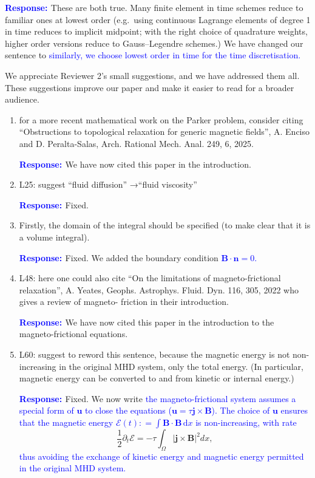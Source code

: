 \documentclass{article}
\theoremstyle{definition}
\newcommand{\dx}{\,\mathrm{d}x}
\newcommand{\rv}[1]{%
  \colorbox{gray!20}{%
    \parbox{0.96\linewidth}{%
      \small #1
    }%
  }%
}
\newcommand{\rp}{\textbf{\textcolor{blue}{Response: }}}
\newcommand{\blue}[1]{\textcolor{blue}{#1}}
\begin{document}
\begin{enumerate}
\rp These are both true. Many finite element in time schemes reduce to familiar ones at lowest order (e.g.~using continuous Lagrange elements of degree 1 in time reduces to implicit midpoint; with the right choice of quadrature weights, higher order versions reduce to Gauss--Legendre schemes.) We have changed our sentence to \blue{similarly, we choose lowest order in time for the time discretisation.}
\end{enumerate}

We appreciate Reviewer 2's small suggestions, and we have addressed them all. These suggestions improve our paper and make it easier to read for a broader audience.

\begin{enumerate}
    \item \rv{for a more recent mathematical work on the Parker problem, consider citing “Obstructions to topological relaxation for generic magnetic fields”, A. Enciso and D. Peralta-Salas,
Arch. Rational Mech. Anal. 249, 6, 2025.}

\rp We have now cited this paper in the introduction.

\item \rv{L25: suggest “fluid diﬀusion” →“fluid viscosity”}

\rp Fixed. 

\item \rv{Firstly, the domain of the integral should be specified (to make clear that it is a
volume integral).}

\rp Fixed. We added the boundary condition \blue{$\bm B\cdot \bm n=0$.} 

\item \rv{L48: here one could also cite “On the limitations of magneto-frictional relaxation”, A.
Yeates, Geophs. Astrophys. Fluid. Dyn. 116, 305, 2022 who gives a review of magneto-
friction in their introduction.}

\rp We have now cited this paper in the introduction to the magneto-frictional equations.

\item \rv{L60: suggest to reword this sentence, because the magnetic energy is not non-increasing
in the original MHD system, only the total energy. (In particular, magnetic energy can be
converted to and from kinetic or internal energy.)}

\rp Fixed. We now write \blue{the magneto-frictional system assumes a special form of $\bm{u}$ to close the equations ($\bm{u}=\tau \bm{j}\times \bm{B}$). The choice of $\bm{u}$ ensures that the magnetic energy  $\mathcal{E}(t): = \int \bm B\cdot \bm B\dx$ is non-increasing, with rate}
\begin{equation}\label{eqn:energy-equality}
    \frac{1}{2} \partial_t \mathcal{E} = -\tau \int_{\Omega}|\bm j\times \bm B|^2 dx,
\end{equation}
\blue{thus avoiding the exchange of kinetic energy and magnetic energy permitted in the original MHD system.} 


\end{enumerate}
\end{document}
